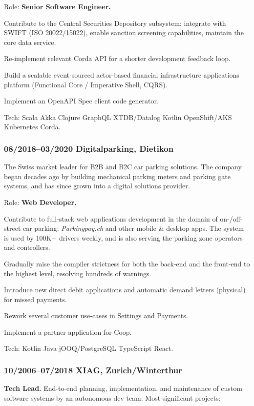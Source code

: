 \documentclass[a4paper, twocolumn, 10pt]{article}
\begin{document}
Role: \textbf{Senior Software Engineer.}

Contribute to the Central Securities Depository subsystem; integrate with SWIFT (ISO 20022/15022),
enable sanction screening capabilities, maintain the core data service.

Re-implement relevant Corda API for a shorter development feedback loop.

Build a scalable event-sourced actor-based financial infrastructure applications platform (Functional Core /
Imperative Shell, CQRS).

Implement an OpenAPI Spec client code generator.

Tech: Scala Akka Clojure GraphQL XTDB/Datalog Kotlin OpenShift/AKS Kubernetes Corda.

\subsubsection*{08/2018--03/2020 Digitalparking, Dietikon}

The Swiss market leader for B2B and B2C car parking solutions. The company began decades ago by
building mechanical parking meters and parking gate systems, and has since grown into a digital
solutions provider.

Role: \textbf{Web Developer.}

Contribute to full-stack web applications development in the domain of on-/off-street car parking:
\emph{Parkingpay.ch} and other mobile \& desktop apps. The system is used by 100K+ drivers weekly,
and is also serving the parking zone operators and controllers.

Gradually raise the compiler strictness for both the back-end and the front-end to the highest
level, resolving hundreds of warnings.

Introduce new direct debit applications and automatic demand letters (physical) for missed payments.

Rework several customer use-cases in Settings and Payments.

Implement a partner application for Coop.

Tech: Kotlin Java jOOQ/PostgreSQL TypeScript React.

\subsubsection*{10/2006--07/2018 XIAG, Zurich/Winterthur}

\textbf{Tech Lead.} End-to-end planning, implementation, and maintenance of custom
software systems by an autonomous dev team. Most significant projects:
\end{document}
